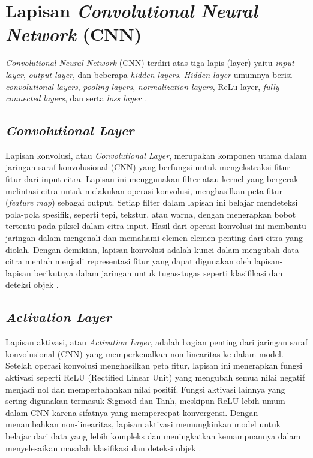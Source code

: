 \section{Lapisan \textit{Convolutional Neural Network} (CNN)}
\textit{Convolutional Neural Network} (CNN) terdiri atas tiga lapis (layer) yaitu \textit{input layer}, \textit{output layer}, dan beberapa \textit{hidden layers}. \textit{Hidden layer} umumnya berisi \textit{convolutional layers},\textit{ pooling layers}, \textit{normalization layers}, ReLu layer, \textit{fully connected layers}, dan serta \textit{loss layer} \cite{alom2018}.

\subsection{\textit{Convolutional Layer}}
Lapisan konvolusi, atau \textit{Convolutional Layer}, merupakan komponen utama dalam jaringan saraf konvolusional (CNN) yang berfungsi untuk mengekstraksi fitur-fitur dari input citra. Lapisan ini menggunakan filter atau kernel yang bergerak melintasi citra untuk melakukan operasi konvolusi, menghasilkan peta fitur (\textit{feature map}) sebagai output. Setiap filter dalam lapisan ini belajar mendeteksi pola-pola spesifik, seperti tepi, tekstur, atau warna, dengan menerapkan bobot tertentu pada piksel dalam citra input. Hasil dari operasi konvolusi ini membantu jaringan dalam mengenali dan memahami elemen-elemen penting dari citra yang diolah. Dengan demikian, lapisan konvolusi adalah kunci dalam mengubah data citra mentah menjadi representasi fitur yang dapat digunakan oleh lapisan-lapisan berikutnya dalam jaringan untuk tugas-tugas seperti klasifikasi dan deteksi objek \cite{Goodfellow-et-al-2016}.

\subsection{\textit{Activation Layer}}
Lapisan aktivasi, atau \textit{Activation Layer}, adalah bagian penting dari jaringan saraf konvolusional (CNN) yang memperkenalkan non-linearitas ke dalam model. Setelah operasi konvolusi menghasilkan peta fitur, lapisan ini menerapkan fungsi aktivasi seperti ReLU (Rectified Linear Unit) yang mengubah semua nilai negatif menjadi nol dan mempertahankan nilai positif. Fungsi aktivasi lainnya yang sering digunakan termasuk Sigmoid dan Tanh, meskipun ReLU lebih umum dalam CNN karena sifatnya yang mempercepat konvergensi. Dengan menambahkan non-linearitas, lapisan aktivasi memungkinkan model untuk belajar dari data yang lebih kompleks dan meningkatkan kemampuannya dalam menyelesaikan masalah klasifikasi dan deteksi objek \cite{Goodfellow-et-al-2016}.

